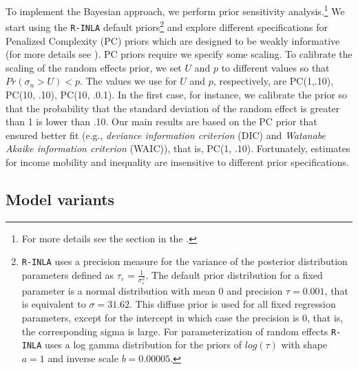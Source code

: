 \documentclass[11pt]{article}
\begin{document}
To implement the Bayesian approach, we perform prior sensitivity analysis.\footnote{For more details see the \textit{} section in the \textit{}.} We start using the \texttt{R-INLA} default priors\footnote{\texttt{R-INLA} uses a precision measure for the variance of the posterior distribution parameters defined as $\tau_{\varepsilon} = \frac{1}{ \sigma^2_{\varepsilon} }$. The default prior distribution for a fixed parameter is a normal distribution with mean 0 and precision $\tau = 0.001$, that is equivalent to $\sigma = 31.62$. This diffuse prior is used for all fixed regression parameters, except for the intercept in which case the precision is 0, that is, the corresponding sigma is large. For parameterization of random effects \texttt{R-INLA} uses a log gamma distribution for the priors of $log(\tau)$ with shape $a = 1$ and inverse scale $b = 0.00005$.} and explore different specifications for Penalized Complexity (PC) priors which are designed to be weakly informative (for more details see \cite{Simpson2017}).  PC priors require we specify some scaling. To calibrate the scaling of the random effects prior, we set $U$ and $p$ to different values so that $Pr(\sigma_u > U) < p$. The values we use for $U$ and $p$, respectively, are PC(1,.10), PC(10, .10), PC(10, .0.1). In the first case, for instance, we calibrate the prior so that the probability that the standard deviation of the random effect is greater than 1 is lower than .10. Our main results are based on the PC prior that ensured better fit (e.g., \textit{deviance information criterion} (DIC) and \textit{Watanabe Akaike information criterion} (WAIC)), that is, PC(1, .10). Fortunately, estimates for income mobility and inequality are insensitive to different prior specifications. 

\subsection{Model variants}
\end{document}
